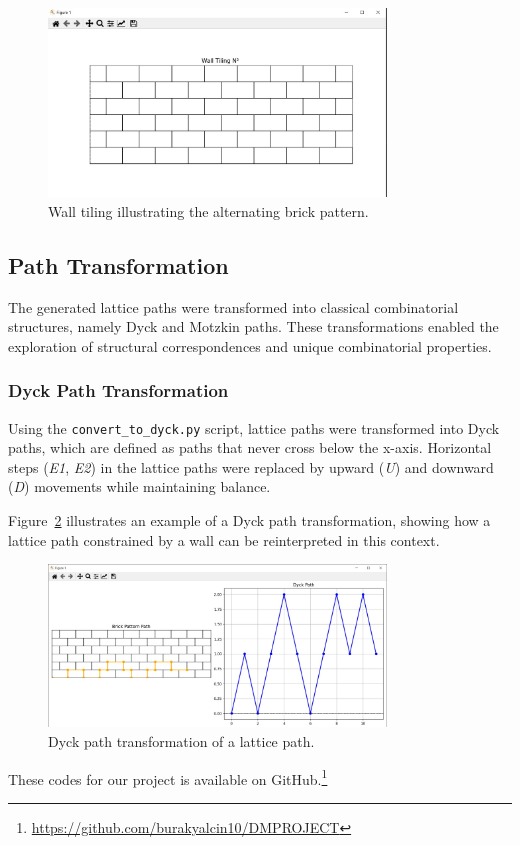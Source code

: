 \documentclass{article}
\begin{document}
\begin{figure}[h]
    \centering
    \includegraphics[width=0.8\textwidth]{images/walltilling.jpg}
    \caption{Wall tiling illustrating the alternating brick pattern.}
    \label{fig:wall_tiling}
\end{figure}


\subsection{Path Transformation}

The generated lattice paths were transformed into classical combinatorial structures, namely Dyck and Motzkin paths. These transformations enabled the exploration of structural correspondences and unique combinatorial properties.

\subsubsection{Dyck Path Transformation}
Using the \texttt{convert\_to\_dyck.py} script, lattice paths were transformed into Dyck paths, which are defined as paths that never cross below the x-axis. Horizontal steps (\textit{E1}, \textit{E2}) in the lattice paths were replaced by upward (\textit{U}) and downward (\textit{D}) movements while maintaining balance.

Figure~\ref{fig:dyck_path} illustrates an example of a Dyck path transformation, showing how a lattice path constrained by a wall can be reinterpreted in this context.

\begin{figure}[h]
    \centering
    \includegraphics[width=0.8\textwidth]{images/dyckpath.jpg}
    \caption{Dyck path transformation of a lattice path.}
    \label{fig:dyck_path}
\end{figure}
These codes for our project is available on GitHub.\footnote{\url{https://github.com/burakyalcin10/DMPROJECT}}
\end{document}
